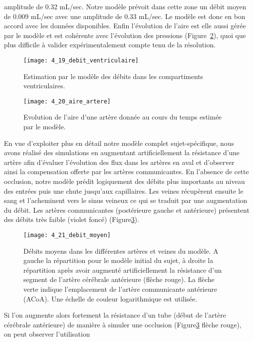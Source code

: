 amplitude de 0.32 mL/sec. Notre modèle prévoit dans cette zone un débit moyen de 0.009 mL/sec
avec une amplitude de 0.33 mL/sec. Le modèle est donc en bon accord avec les données disponibles.
Enfin l’évolution de l’aire est elle aussi gérée par le modèle et est cohérente avec l’évolution des
pressions (Figure~\ref{fig:4_20_aire_artere}), quoi que plus difficile à valider expérimentalement compte tenu de la résolution.\\
\begin{figure}[!t]
\centering
\texttt{[image: 4\_19\_debit\_ventriculaire]}
\caption{Estimation par le modèle des débits dans les compartiments ventriculaires.}
\label{fig:4_19_debit_ventriculaire}	
\end{figure}
\begin{figure}[!t]
\centering
\texttt{[image: 4\_20\_aire\_artere]}
\caption{Evolution de l'aire d'une artère donnée au cours du temps estimée par le modèle.}
\label{fig:4_20_aire_artere}	
\end{figure}
En vue d’exploiter plus en détail notre modèle complet sujet-spécifique, nous avons réalisé des
simulations en augmentant artificiellement la résistance d’une artère afin d’évaluer l’évolution des flux
dans les artères en aval et d’observer ainsi la compensation offerte par les artères communicantes. En
l’absence de cette occlusion, notre modèle prédit logiquement des débits plus importants au niveau
des entrées puis une chute jusqu’aux capillaires. Les veines récupèrent ensuite le sang et l’acheminent
vers le sinus veineux ce qui se traduit par une augmentation du débit. Les artères communicantes
(postérieure gauche et antérieure) présentent des débits très faible (violet foncé) (Figure\ref{fig:4_21_debit_moyen}).\\
\begin{figure}[!t]
\centering
\texttt{[image: 4\_21\_debit\_moyen]}
\caption{Débits moyens dans les différentes artères et veines du modèle. A gauche la répartition pour le modèle initial du
sujet, à droite la répartition après avoir augmenté artificiellement la résistance d’un segment de l’artère cérébrale
antérieure (flèche rouge). La flèche verte indique l’emplacement de l’artère communicante antérieure (ACoA). Une échelle
de couleur logarithmique est utilisée.}
\label{fig:4_21_debit_moyen}	
\end{figure}
Si l’on augmente alors fortement la résistance d’un tube (début de l’artère cérébrale
antérieure) de manière à simuler une occlusion (Figure\ref{fig:4_21_debit_moyen} flèche rouge), on peut observer l’utilisation
